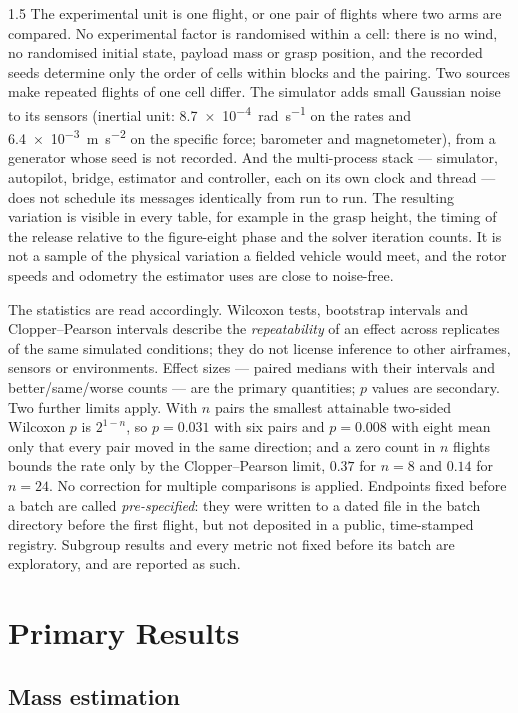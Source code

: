 \begin{spacing}{1.5}
The experimental unit is one flight, or one pair of flights where two arms are
compared. No experimental factor is randomised within a cell: there is no wind,
no randomised initial state, payload mass or grasp position, and the recorded
seeds determine only the order of cells within blocks and the pairing. Two
sources make repeated flights of one cell differ. The simulator adds small
Gaussian noise to its sensors (inertial unit: \SI{8.7e-4}{\radian\per\second}
on the rates and \SI{6.4e-3}{\meter\per\second\squared} on the specific force;
barometer and magnetometer), from a generator whose seed is not recorded. And
the multi-process stack --- simulator, autopilot, bridge, estimator and
controller, each on its own clock and thread --- does not schedule its messages
identically from run to run. The resulting variation is visible in every table,
for example in the grasp height, the timing of the release relative to the
figure-eight phase and the solver iteration counts. It is not a sample of the
physical variation a fielded vehicle would meet, and the rotor speeds and
odometry the estimator uses are close to noise-free.

The statistics are read accordingly. Wilcoxon tests, bootstrap intervals and
Clopper--Pearson intervals describe the \emph{repeatability} of an effect across
replicates of the same simulated conditions; they do not license inference to
other airframes, sensors or environments. Effect sizes --- paired medians with
their intervals and better/same/worse counts --- are the primary quantities; $p$
values are secondary. Two further limits apply. With $n$ pairs the smallest
attainable two-sided Wilcoxon $p$ is $2^{1-n}$, so $p=0.031$ with six pairs and
$p=0.008$ with eight mean only that every pair moved in the same direction; and
a zero count in $n$ flights bounds the rate only by the Clopper--Pearson limit,
$0.37$ for $n=8$ and $0.14$ for $n=24$. No correction for multiple comparisons
is applied. Endpoints fixed before a batch are called \emph{pre-specified}: they
were written to a dated file in the batch directory before the first flight, but
not deposited in a public, time-stamped registry. Subgroup results and every
metric not fixed before its batch are exploratory, and are reported as such.

\section{Primary Results}\label{sec:eval:results}

\subsection{Mass estimation}\label{sec:eval:estimation}


\end{spacing}
